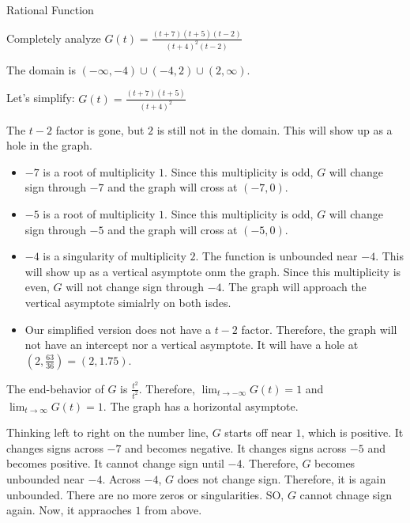 \documentclass{ximera}
\begin{document}
\begin{example} Rational Function


Completely analyze $G(t) = \frac{(t+7)(t+5)(t-2)}{(t+4)^2(t-2)}$


The domain is $(-\infty, -4) \cup (-4,2) \cup (2, \infty)$.

Let's simplify: $G(t) = \frac{(t+7)(t+5)}{(t+4)^2}$



The $t-2$ factor is gone, but $2$ is still not in the domain.  This will show up as a hole in the graph.



\begin{itemize}
\item $-7$ is a root of multiplicity $1$.  Since this multiplicity is odd, $G$ will change sign through $-7$ and the graph will cross at $(-7,0)$.
\item $-5$ is a root of multiplicity $1$.  Since this multiplicity is odd, $G$ will change sign through $-5$ and the graph will cross at $(-5,0)$.
\item $-4$ is a singularity of multiplicity $2$.  The function is unbounded near $-4$.  This will show up as a vertical asymptote onm the graph. Since this multiplicity is even, $G$ will not change sign through $-4$.  The graph will approach the vertical asymptote simialrly on both isdes.
\item Our simplified version does not have a $t-2$ factor.  Therefore, the graph will not have an intercept nor a vertical asymptote.  It will have a hole at $\left(2, \frac{63}{36}\right) = (2, 1.75)$.
\end{itemize}


The end-behavior of $G$ is $\frac{t^2}{t^2}$.  Therefore, $\lim_{t \to -\infty}G(t) = 1$ and $\lim_{t \to \infty}G(t) = 1$.  The graph has a horizontal asymptote.




Thinking left to right on the number line, $G$ starts off near $1$, which is positive.  It changes signs across $-7$ and becomes negative. It changes signs across $-5$ and becomes positive.  It cannot change sign until $-4$.  Therefore, $G$ becomes unbounded near $-4$.  Across $-4$, $G$ does not change sign.  Therefore, it is again unbounded.  There are no more zeros or singularities.  SO, $G$ cannot chnage sign again.  Now, it appraoches $1$ from above.





\end{example}
\end{document}

